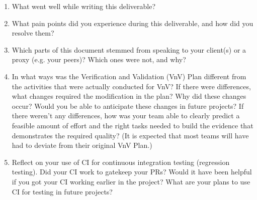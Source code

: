 \documentclass[12pt, titlepage]{article}
\begin{document}


\begin{enumerate}
  \item What went well while writing this deliverable? 
  \item What pain points did you experience during this deliverable, and how
    did you resolve them?
  \item Which parts of this document stemmed from speaking to your client(s) or
  a proxy (e.g. your peers)? Which ones were not, and why?
  \item In what ways was the Verification and Validation (VnV) Plan different
  from the activities that were actually conducted for VnV?  If there were
  differences, what changes required the modification in the plan?  Why did
  these changes occur?  Would you be able to anticipate these changes in future
  projects?  If there weren't any differences, how was your team able to clearly
  predict a feasible amount of effort and the right tasks needed to build the
  evidence that demonstrates the required quality?  (It is expected that most
  teams will have had to deviate from their original VnV Plan.)
  \item Reflect on your use of CI for continuous integration testing (regression
  testing). Did your CI work to gatekeep your PRs?  Would it have been helpful
  if you got your CI working earlier in the project?  What are your plans to use
  CI for testing in future projects?
\end{enumerate}
    
\end{document}
